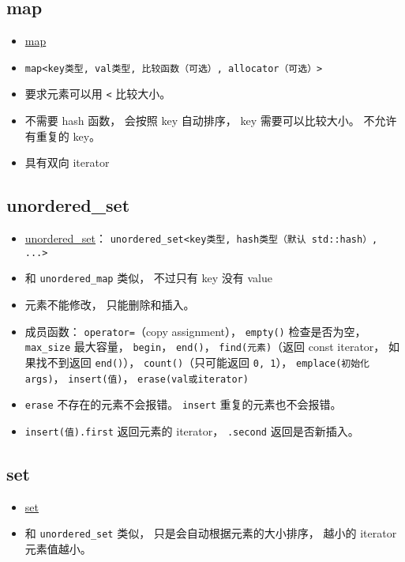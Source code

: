 \subsection{map}
\begin{itemize}
\item \href{https://cplusplus.com/reference/map/map/}{map}
\item \verb|map<key类型, val类型, 比较函数（可选）, allocator（可选）>|
\item 要求元素可以用 \verb|<| 比较大小。
\item 不需要 hash 函数， 会按照 key 自动排序， key 需要可以比较大小。 不允许有重复的 key。
\item 具有双向 iterator
\end{itemize}

\subsection{unordered\_set}
\begin{itemize}
\item \href{https://cplusplus.com/reference/unordered_set/unordered_set/}{unordered\_set}： \verb|unordered_set<key类型, hash类型（默认 std::hash）, ...>|
\item 和 \verb|unordered_map| 类似， 不过只有 key 没有 value
\item 元素不能修改， 只能删除和插入。
\item 成员函数： \verb|operator=|（copy assignment）， \verb|empty()| 检查是否为空， \verb|max_size| 最大容量， \verb|begin|， \verb|end()|， \verb|find(元素)|（返回 const iterator， 如果找不到返回 \verb|end()|）， \verb|count()|（只可能返回 \verb|0, 1|）， \verb|emplace(初始化args)|， \verb|insert(值)|， \verb|erase(val或iterator)|
\item \verb|erase| 不存在的元素不会报错。 \verb|insert| 重复的元素也不会报错。
\item \verb|insert(值).first| 返回元素的 iterator， \verb|.second| 返回是否新插入。
\end{itemize}

\subsection{set}
\begin{itemize}
\item \href{https://en.cppreference.com/w/cpp/container/set}{set}
\item 和 \verb|unordered_set| 类似， 只是会自动根据元素的大小排序， 越小的 iterator 元素值越小。
\end{itemize}

